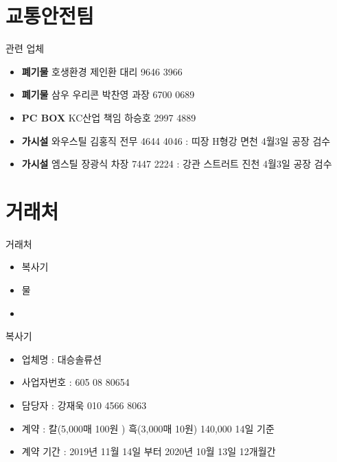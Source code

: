 \documentclass[aspectratio=1610,17pt,xcolor=pdftex,dvipsnames,table,handout]{beamer}
\begin{document}
		\section{ 교통안전팀 }
		\frame [plain] {\sectionpage}


		\begin{frame} [t,plain]
			\begin{block} {관련 업체}
			\begin{itemize}
				 \setlength{\leftmargin}	{18.0em} 
				 \setlength{\labelwidth}	{18em} 
				 \setlength{\labelsep}	{1em}
				\item \textbf{폐기물} 호생환경 제인환 대리 9646 3966
				\item \textbf{폐기물} 삼우 우리콘 박찬영 과장 6700 0689
				\item \textbf{PC BOX} KC산업 책임 하승호 2997 4889
				\item \textbf{가시설} 와우스틸 김홍직 전무 4644 4046 : 띠장 H형강 면천 4월3일 공장 검수 
				\item \textbf{가시설} 엠스틸 장광식 차장 7447 2224 : 강관 스트러트 진천  4월3일 공장 검수

			\end{itemize}
			\end{block}
		\end{frame}



		\section{거래처}
		\frame [plain] {\sectionpage}
		

		\begin{frame} [t,plain]
			\begin{block} {거래처 }
			\begin{itemize}
				\item 복사기 
				\item 물
				\item  
			\end{itemize}
			
			\end{block}
		\end{frame}

		\begin{frame} [t,plain]
			\begin{block} {복사기 }
			\begin{itemize}
				\item 업체명 : 대승솔류션
				\item 사업자번호 : 605  08 80654 
				\item 담당자   :  강재욱 010 4566  8063
				\item  계약 : 칼(5,000매 100원 ) 흑(3,000매 10원)  140,000 14일 기준
				\item  계약 기간 : 2019년 11월 14일 부터 2020년 10월 13일 12개월간 
			\end{itemize}
			\end{block}
		\end{frame}
\end{document}
